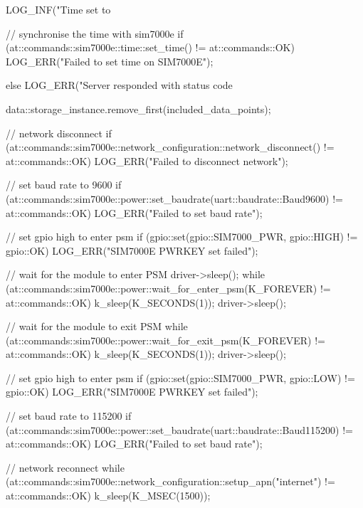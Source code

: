 \begin{cpp}[caption={Implementation of the data transmission thread}]
{{{{{{                        LOG_INF("Time set to %

                        // synchronise the time with sim7000e
                        if (at::commands::sim7000e::time::set_time() != at::commands::OK)
                        {
                            LOG_ERR("Failed to set time on SIM7000E");
                        }
                    }
                    else
                    {
                        LOG_ERR("Server responded with status code %
                    }
                }
            }
            data::storage_instance.remove_first(included_data_points);
        }

        // network disconnect
        if (at::commands::sim7000e::network_configuration::network_disconnect() != at::commands::OK)
        {
            LOG_ERR("Failed to disconnect network");
        }

        // set baud rate to 9600
        if (at::commands::sim7000e::power::set_baudrate(uart::baudrate::Baud9600) != at::commands::OK)
        {
            LOG_ERR("Failed to set baud rate");
        }

        // set gpio high to enter psm
        if (gpio::set(gpio::SIM7000_PWR, gpio::HIGH) != gpio::OK)
        {
            LOG_ERR("SIM7000E PWRKEY set failed");
        }

        // wait for the module to enter PSM
        driver->sleep();
        while (at::commands::sim7000e::power::wait_for_enter_psm(K_FOREVER) != at::commands::OK)
        {
            k_sleep(K_SECONDS(1));
            driver->sleep();
        }

        // wait for the module to exit PSM
        while (at::commands::sim7000e::power::wait_for_exit_psm(K_FOREVER) != at::commands::OK)
        {
            k_sleep(K_SECONDS(1));
            driver->sleep();
        }

        // set gpio high to enter psm
        if (gpio::set(gpio::SIM7000_PWR, gpio::LOW) != gpio::OK)
        {
            LOG_ERR("SIM7000E PWRKEY set failed");
        }

        // set baud rate to 115200
        if (at::commands::sim7000e::power::set_baudrate(uart::baudrate::Baud115200) != at::commands::OK)
        {
            LOG_ERR("Failed to set baud rate");
        }

        // network reconnect
        while (at::commands::sim7000e::network_configuration::setup_apn("internet") != at::commands::OK)
        {
            k_sleep(K_MSEC(1500));
        }
    }
}
\end{cpp}